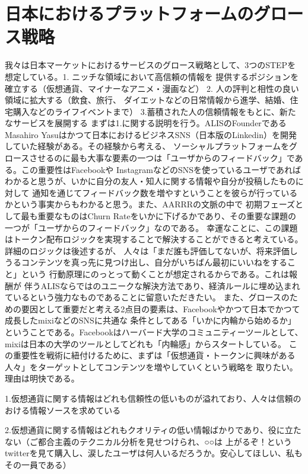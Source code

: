 \documentclass{jsarticle}
\begin{document}
\section{日本におけるプラットフォームのグロース戦略}
我々は日本マーケットにおけるサービスのグロース戦略として、3つのSTEPを想定している。1. ニッチな領域において高信頼の情報を
提供するポジションを確立する（仮想通貨、マイナーなアニメ・漫画など） 2. 人の評判と相性の良い領域に拡大する（飲食、旅行、
ダイエットなどの日常情報から進学、結婚、住宅購入などのライフイベントまで） 3.蓄積された人の信頼情報をもとに、新たなサービスを展開する
まずは1.に関する説明を行う。ALISのFounderである
Masahiro Yasuはかつて日本におけるビジネスSNS（日本版のLinkedin）を開発していた経験がある。その経験から考える、
ソーシャルプラットフォームをグロースさせるのに最も大事な要素の一つは「ユーザからのフィードバック」である。この重要性はFacebookや
InstagramなどのSNSを使っているユーザであればわかると思うが、いかに自分の友人・知人に関する情報や自分が投稿したものに対して
通知を通じてフィードバック数を増やすということを彼らが行っているかという事実からもわかると思う。また、AARRRの文脈の中で
初期フェーズとして最も重要なものはChurn Rateをいかに下げるかであり、その重要な課題の一つが「ユーザからのフィードバック」なのである。
幸運なことに、この課題はトークン配布ロジックを実現することで解決することができると考えている。詳細のロジックは後述するが、
人々は「まだ誰も評価してないが、将来評価しうるコンテンツを真っ先に見つけ出し、自分がいちばん最初にいいねをすること」という
行動原理にのっとって動くことが想定されるからである。これは報酬が
伴うALISならではのユニークな解決方法であり、経済ルールに埋め込まれているという強力なものであることに留意いただきたい。
また、グロースのための要因として重要だと考える2点目の要素は、Facebookやかつて日本でかつて成長したmixiなどのSNSに共通な
条件としてある「いかに内輪から始めるか」ということである。Facebookはハーバード大学のコミュニティーツールとして、
mixiは日本の大学のツールとしてどれも「内輪感」からスタートしている。
この重要性を戦術に紐付けるために、まずは「仮想通貨・トークンに興味がある人々」をターゲットとしてコンテンツを増やしていくという戦略を
取りたい。理由は明快である。

1.仮想通貨に関する情報はどれも信頼性の低いものが溢れており、人々は信頼のおける情報ソースを求めている

2.仮想通貨に関する情報はどれもクオリティの低い情報ばかりであり、役に立たない（ご都合主義のテクニカル分析を見せつけられ、○○は
上がるぞ！というtwitterを見て購入し、涙したユーザは何人いるだろうか。安心してほしい、私もその一員である）
\end{document}
